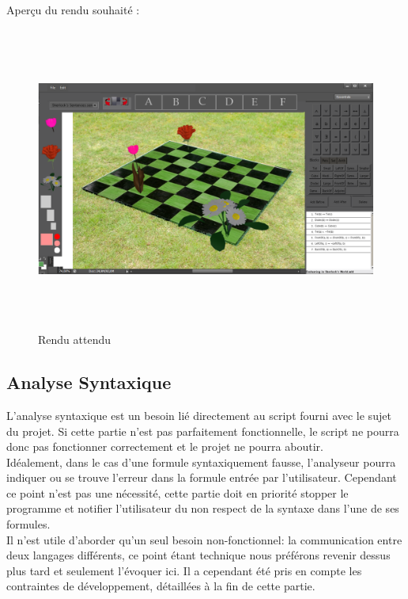 Aperçu du rendu souhaité :

\begin{figure}[!h]
\begin{center}
\includegraphics[height=10cm]{besoins/simulation.png}
\end{center}
\caption{Rendu attendu}
\end{figure}

\clearpage


\subsection{Analyse Syntaxique}

L'analyse syntaxique est un besoin lié directement au script fourni avec le sujet du projet. Si cette partie n'est pas parfaitement fonctionnelle, le script ne pourra donc pas fonctionner correctement et le projet ne pourra aboutir.\\
Idéalement, dans le cas d'une formule syntaxiquement fausse, l'analyseur pourra indiquer ou se trouve l'erreur dans la formule entrée par l'utilisateur. Cependant ce point n'est pas une nécessité, cette partie doit en priorité stopper le programme et notifier l'utilisateur du non respect de la syntaxe dans l'une de ses formules.\\

Il n'est utile d'aborder qu'un seul besoin non-fonctionnel: la communication entre deux langages différents, ce point étant technique nous préférons revenir dessus plus tard et seulement l'évoquer ici.
Il a cependant été pris en compte les contraintes de développement,  détaillées à la fin de cette partie.


